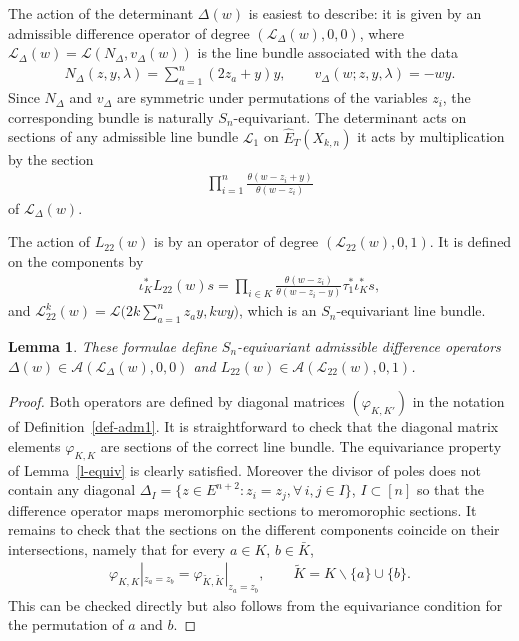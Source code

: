 \documentclass[pdftex]{sigma}
\numberwithin{equation}{section}
\newtheorem{Lemma}[Theorem]{Lemma}
\begin{document}
The action of the determinant $\Delta(w)$ is easiest to describe: it is given by an admissible difference operator of degree $(\mathcal L_\Delta(w),0,0)$, where $\mathcal L_\Delta(w)=\mathcal L(N_\Delta,v_\Delta(w))$ is the line bundle associated with the data
\begin{gather*}
 N_\Delta(z,y,\lambda)= \sum_{a=1}^n (2z_a+y)y, \qquad v_\Delta(w;z,y,\lambda)=-wy.
\end{gather*}
Since $N_\Delta$ and $v_\Delta$ are symmetric under permutations of the variables $z_i$, the corresponding bundle is naturally $S_n$-equivariant. The determinant acts on sections of any admissible line bundle $\mathcal L_1$ on $\hat E_T(X_{k,n})$ it acts by multiplication by the section
\begin{gather*}
 \prod_{i=1}^n\frac{\theta(w-z_i+y)}{\theta(w-z_i)}
\end{gather*}
of $\mathcal L_\Delta(w)$.

The action of $L_{22}(w)$ is by an operator of degree $(\mathcal L_{22}(w),0,1)$. It is defined on the components by
\begin{gather*}
 \iota^*_KL_{22}(w)s=\prod_{i\in K}\frac{\theta(w-z_i)}{\theta(w-z_i-y)} \tau_1^*\iota_K^*s,
\end{gather*}
and $\mathcal L^k_{22}(w)=\mathcal L\Big(2k\sum\limits_{a=1}^nz_ay,kwy\Big)$, which is an $S_n$-equivariant line bundle.
\begin{Lemma}\label{l-L22Delta} These formulae define $S_n$-equivariant admissible difference operators $\Delta(w)\in\mathcal A(\mathcal L_\Delta(w),0,0)$ and $L_{22}(w)\in\mathcal A(\mathcal L_{22}(w),0,1)$.
\end{Lemma}
\begin{proof} Both operators are defined by diagonal matrices $(\varphi_{K,K'})$ in the notation of Definition~\ref{def-adm1}. It is straightforward to check that the diagonal matrix elements $\varphi_{K,K}$ are sections of the correct line bundle. The equivariance property of Lemma~\ref{l-equiv} is clearly satisfied. Moreover the divisor of poles does not contain any diagonal $\Delta_I=\big\{z\in E^{n+2}\colon z_i=z_j, \forall\, i,j\in I\big\}$, $I\subset[n]$ so that the difference operator maps meromorphic sections to meromorophic sections. It remains to check that the sections on the different components coincide on their intersections, namely that for every $a\in K$, $b\in\bar K$,
 \begin{gather*}
 \varphi_{K,K}|_{z_a=z_b}=\varphi_{\tilde K,\tilde K}|_{z_a=z_b}, \qquad \tilde K=K\smallsetminus \{a\}\cup\{b\}.
 \end{gather*}
 This can be checked directly but also follows from the equivariance condition for the permutation of $a$ and $b$.
\end{proof}
\end{document}
